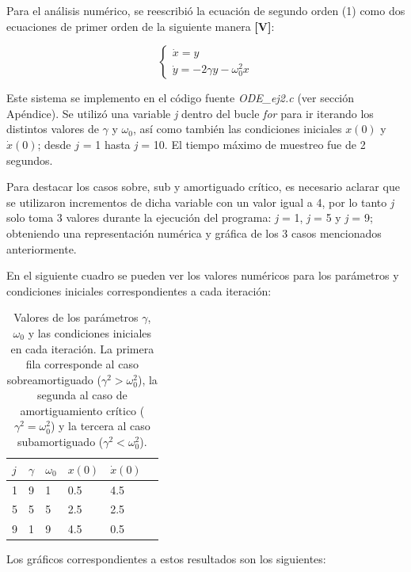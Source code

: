 \documentclass[a4paper,12pt]{article}
\begin{document}
Para el an\'alisis num\'erico, se reescribi\'o la ecuaci\'on de segundo orden (1) como dos ecuaciones de primer orden de la siguiente manera \textbf{[V]}:

$$ \begin{cases} \dot{x} = y \\ \dot{y} = -2\gamma y - \omega_0^2 x \end{cases} $$

Este sistema se implemento en el c\'odigo fuente \textit{ODE\_ej2.c} (ver secci\'on Ap\'endice). Se utiliz\'o una variable \textit{j} dentro del bucle \textit{for} para ir iterando los distintos valores de $\gamma$ y $\omega_0$, as\'i como tambi\'en las condiciones iniciales $x(0)$ y $\dot{x}(0)$; desde $j$ = 1 hasta \textit{j} = 10. El tiempo m\'aximo de muestreo fue de 2 segundos.

Para destacar los casos sobre, sub y amortiguado cr\'itico, es necesario aclarar que se utilizaron incrementos de dicha variable con un valor igual a 4, por lo tanto \textit{j} solo toma 3 valores durante la ejecuci\'on del programa: \textit{j} = 1, \textit{j} = 5 y \textit{j} = 9; obteniendo una representaci\'on num\'erica y gr\'afica de los 3 casos mencionados anteriormente.

En el siguiente cuadro se pueden ver los valores num\'ericos para los par\'ametros y condiciones iniciales correspondientes a cada iteraci\'on:

\begin{table}
	\centering
    \begin{tabular}{ | l | l | l | l | l |p{5cm} |}
    \hline
    $j$ & $\gamma$ & $\omega_0$ & $x(0)$ &  $\dot{x}(0)$ \\ \hline
    1 & 9 & 1 & 0.5 & 4.5 \\ \hline
    5 & 5 & 5 & 2.5 & 2.5 \\ \hline
    9 & 1 & 9 & 4.5 & 0.5 \\
    \hline
    \end{tabular}
    \caption{Valores de los par\'ametros $\gamma$, $\omega_0$ y las condiciones iniciales en cada iteraci\'on. La primera fila corresponde al caso sobreamortiguado ($\gamma^2 > \omega_0^2$), la segunda al caso de amortiguamiento cr\'itico ($\gamma^2 = \omega_0^2$) y la tercera al caso subamortiguado ($\gamma^2 < \omega_0^2$).}
    \label{table:1}
\end{table}
\newpage


Los gr\'aficos correspondientes a estos resultados son los siguientes:
\end{document}
